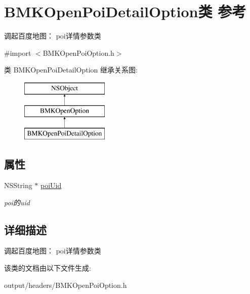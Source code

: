 \hypertarget{interface_b_m_k_open_poi_detail_option}{}\section{B\+M\+K\+Open\+Poi\+Detail\+Option类 参考}
\label{interface_b_m_k_open_poi_detail_option}


调起百度地图： poi详情参数类  




{\ttfamily \#import $<$B\+M\+K\+Open\+Poi\+Option.\+h$>$}

类 B\+M\+K\+Open\+Poi\+Detail\+Option 继承关系图\+:\begin{figure}[H]
\begin{center}
\leavevmode
\includegraphics[height=3.000000cm]{interface_b_m_k_open_poi_detail_option}
\end{center}
\end{figure}
\subsection*{属性}
\begin{DoxyCompactItemize}
\item 
\hypertarget{interface_b_m_k_open_poi_detail_option_ab0bc085980efdb2f5cd39a82159d9309}{}N\+S\+String $\ast$ \hyperlink{interface_b_m_k_open_poi_detail_option_ab0bc085980efdb2f5cd39a82159d9309}{poi\+Uid}\label{interface_b_m_k_open_poi_detail_option_ab0bc085980efdb2f5cd39a82159d9309}

\begin{DoxyCompactList}\small\item\em poi的uid \end{DoxyCompactList}\end{DoxyCompactItemize}


\subsection{详细描述}
调起百度地图： poi详情参数类 

该类的文档由以下文件生成\+:\begin{DoxyCompactItemize}
\item 
output/headers/B\+M\+K\+Open\+Poi\+Option.\+h\end{DoxyCompactItemize}
